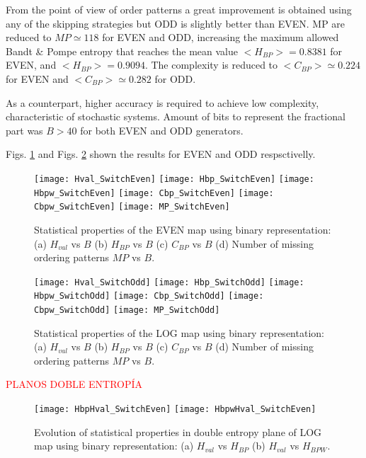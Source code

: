 From the point of view of order patterns a great improvement is obtained using any of the skipping strategies but ODD is slightly better than EVEN.
MP are reduced to $MP\simeq 118$ for EVEN and  ODD, increasing the maximum allowed Bandt \& Pompe entropy that reaches the mean value $<H_{BP}> = 0.8381$ for EVEN, and $<H_{BP}> = 0.9094$.
The complexity is reduced to $<C_{BP}>\simeq 0.224$ for EVEN and  $<C_{BP}>\simeq 0.282$ for ODD.

As a counterpart, higher accuracy is required to achieve low complexity, characteristic of stochastic systems.
Amount of bits to represent the fractional part was $B>40$ for both EVEN and ODD generators.

Figs. \ref{fig:EVEN_QuantiB} and Figs. \ref{fig:ODD_QuantiB} shown the results for EVEN and ODD respsctivelly.

\begin{figure}
	\texttt{[image: Hval\_SwitchEven]}
	\texttt{[image: Hbp\_SwitchEven]}
	\texttt{[image: Hbpw\_SwitchEven]}
	\texttt{[image: Cbp\_SwitchEven]}
	\texttt{[image: Cbpw\_SwitchEven]}
	\texttt{[image: MP\_SwitchEven]}
	\caption{Statistical properties of the EVEN map using binary representation: (a) $H_{val}$ vs $B$ (b) $H_{BP}$ vs $B$ (c) $C_{BP}$ vs $B$ (d) Number of missing ordering patterns $MP$ vs $B$.}
	\label{fig:EVEN_QuantiB}
\end{figure}

\begin{figure}
	\texttt{[image: Hval\_SwitchOdd]}
	\texttt{[image: Hbp\_SwitchOdd]}
	\texttt{[image: Hbpw\_SwitchOdd]}
	\texttt{[image: Cbp\_SwitchOdd]}
	\texttt{[image: Cbpw\_SwitchOdd]}
	\texttt{[image: MP\_SwitchOdd]}
	\caption{Statistical properties of the LOG map using binary representation: (a) $H_{val}$ vs $B$ (b) $H_{BP}$ vs $B$ (c) $C_{BP}$ vs $B$ (d) Number of missing ordering patterns $MP$ vs $B$.}
	\label{fig:ODD_QuantiB}
	\end{figure}

\textcolor{red}{PLANOS DOBLE ENTROPÍA}

\begin{figure}
	\texttt{[image: HbpHval\_SwitchEven]}
	\texttt{[image: HbpwHval\_SwitchEven]}
	\caption{Evolution of statistical properties in double entropy plane of LOG map using binary representation: (a) $H_{val}$ vs $H_{BP}$ (b) $H_{val}$ vs $H_{BPW}$.}
	\label{fig:EVEN_HH}
\end{figure}

